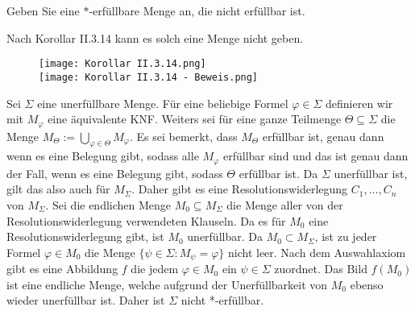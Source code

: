 
\begin{exercise}[26]

Geben Sie eine $\ast$-erfüllbare Menge an, die nicht erfüllbar ist.

\end{exercise}


\begin{solution}

\phantom{}

Nach Korollar II.3.14 kann es solch eine Menge nicht geben.

\begin{figure}
    \begin{boxedin}
        \begin{center}
            \texttt{[image: Korollar II.3.14.png]} \\
            \vspace{0.5 cm}
            \texttt{[image: Korollar II.3.14 - Beweis.png]}
        \end{center}
    \end{boxedin}
\end{figure}

Sei $\Sigma$ eine unerfüllbare Menge. Für eine beliebige Formel $\varphi \in \Sigma$ definieren wir mit
$M_\varphi$ eine äquivalente KNF. Weiters sei für eine ganze Teilmenge $\Theta \subseteq \Sigma$ die Menge
$M_\Theta := \bigcup_{\varphi \in \Theta} M_\varphi$. Es sei bemerkt, dass $M_\Theta$ erfüllbar ist, genau
dann wenn es eine Belegung gibt, sodass alle $M_\varphi$ erfüllbar sind und das ist genau dann der Fall,
wenn es eine Belegung gibt, sodass $\Theta$ erfüllbar ist. Da $\Sigma$ unerfüllbar ist, gilt das also auch
für $M_\Sigma$. Daher gibt es eine Resolutionswiderlegung $C_1, \dots, C_n$ von $M_\Sigma$. Sei die
endlichen Menge $M_0 \subseteq M_\Sigma$ die Menge aller von der Resolutionswiderlegung verwendeten
Klauseln. Da es für $M_0$ eine Resolutionswiderlegung gibt, ist $M_0$ unerfüllbar.
Da $M_0 \subset M_{\Sigma}$, ist zu jeder Formel $\varphi \in M_0$ die Menge
$\{\psi \in \Sigma: M_{\psi} = \varphi\}$ nicht leer. Nach dem Auswahlaxiom gibt es
eine Abbildung $f$ die jedem $\varphi \in M_0$ ein $\psi \in \Sigma$ zuordnet.
Das Bild $f(M_0)$ ist eine endliche Menge, welche aufgrund der Unerfüllbarkeit von $M_0$
ebenso wieder unerfüllbar ist. Daher ist $\Sigma$ nicht *-erfüllbar.

\end{solution}

